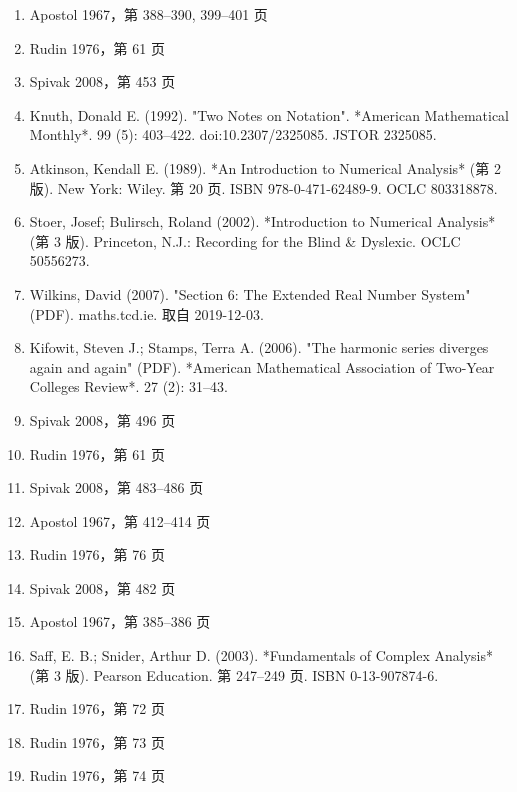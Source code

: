 \begin{enumerate}
\item Apostol 1967，第 388–390, 399–401 页
\item Rudin 1976，第 61 页
\item Spivak 2008，第 453 页
\item Knuth, Donald E. (1992). "Two Notes on Notation". *American Mathematical Monthly*. 99 (5): 403–422. doi:10.2307/2325085. JSTOR 2325085.
\item Atkinson, Kendall E. (1989). *An Introduction to Numerical Analysis* (第 2 版). New York: Wiley. 第 20 页. ISBN 978-0-471-62489-9. OCLC 803318878.
\item Stoer, Josef; Bulirsch, Roland (2002). *Introduction to Numerical Analysis* (第 3 版). Princeton, N.J.: Recording for the Blind & Dyslexic. OCLC 50556273.
\item Wilkins, David (2007). "Section 6: The Extended Real Number System" (PDF). maths.tcd.ie. 取自 2019-12-03.
\item Kifowit, Steven J.; Stamps, Terra A. (2006). "The harmonic series diverges again and again" (PDF). *American Mathematical Association of Two-Year Colleges Review*. 27 (2): 31–43.
\item Spivak 2008，第 496 页
\item Rudin 1976，第 61 页
\item Spivak 2008，第 483–486 页
\item Apostol 1967，第 412–414 页
\item Rudin 1976，第 76 页
\item Spivak 2008，第 482 页
\item Apostol 1967，第 385–386 页
\item Saff, E. B.; Snider, Arthur D. (2003). *Fundamentals of Complex Analysis* (第 3 版). Pearson Education. 第 247–249 页. ISBN 0-13-907874-6.
\item Rudin 1976，第 72 页
\item Rudin 1976，第 73 页
\item Rudin 1976，第 74 页


\end{enumerate}
